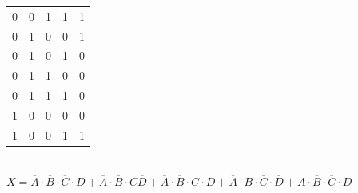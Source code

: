 \begin{center}
\begin{minipage}{0.45\textwidth}
\begin{tabular}{cccc|c}
0 & 0 & 1 & 1 & 1                                  \\
0 & 1 & 0 & 0 & 1                                  \\
0 & 1 & 0 & 1 & 0                                  \\
0 & 1 & 1 & 0 & 0                                  \\
0 & 1 & 1 & 1 & 0                                  \\
1 & 0 & 0 & 0 & 0                                  \\
1 & 0 & 0 & 1 & 1                                 
\end{tabular}\\[10pt]
$X = \overline{A}\cdot\overline{B}\cdot\overline{C}\cdot{}D + \overline{A}\cdot\overline{B}\cdot{}C\overline{D} + \overline{A}\cdot\overline{B}\cdot{}C\cdot{}D + \overline{A}\cdot{}B\cdot\overline{C}\cdot\overline{D} + A\cdot\overline{B}\cdot\overline{C}\cdot{}D$
\end{minipage}
\end{center}
\newpage

